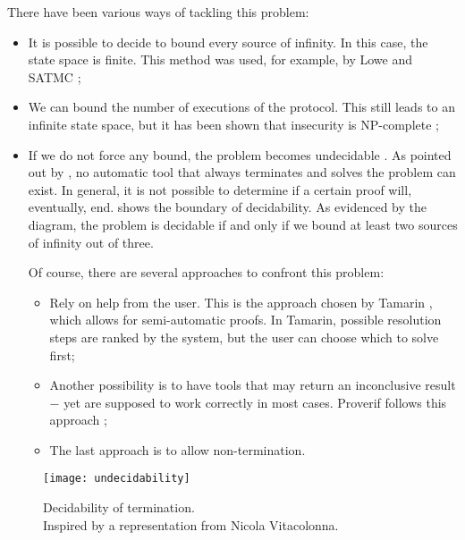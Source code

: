 There have been various ways of tackling this problem:
\begin{itemize}
    \item{It is possible to decide to bound every source of infinity. In this case, the state space is finite. This method was used, for example, by Lowe \cite{LoweNeedhamSchroederPK} and SATMC \cite{SATMC};}

    \item{We can bound the number of executions of the protocol. This still leads to an infinite state space, but it has been shown that insecurity is NP-complete \cite{SymbolicModelNPCompleteInsecurity};}

    \item{If we do not force any bound, the problem becomes undecidable \cite{SymbolicModelUndecidability1} \cite{SymbolicModelUndecidability2}. As pointed out by \BLANC{} \cite{SymbolicVerificationBlanchet}, no automatic tool that always terminates and solves the problem can exist. In general, it is not possible to determine if a certain proof will, eventually, end.  shows the boundary of decidability. As evidenced by the diagram, the problem is decidable if and only if we bound at least two sources of infinity out of three.

                Of course, there are several approaches to confront this problem:

                \begin{itemize}
                    \item{Rely on help from the user. This is the approach chosen by Tamarin \cite{TamarinFoundations}, which allows for semi-automatic proofs. In Tamarin, possible resolution steps are ranked by the system, but the user can choose which to solve first;}
                    \item{Another possibility is to have tools that may return an inconclusive result $-$ yet are supposed to work correctly in most cases. Proverif follows this approach \cite{SymbolicVerificationBlanchet};}
                    \item{The last approach is to allow non-termination.}
                \end{itemize}
          }
\end{itemize}


\begin{figure}[t]
    \texttt{[image: undecidability]}
    \centering
    \caption{Decidability of termination.\\Inspired by a representation from Nicola Vitacolonna.}
    \label{fig:undecidability}
\end{figure}
